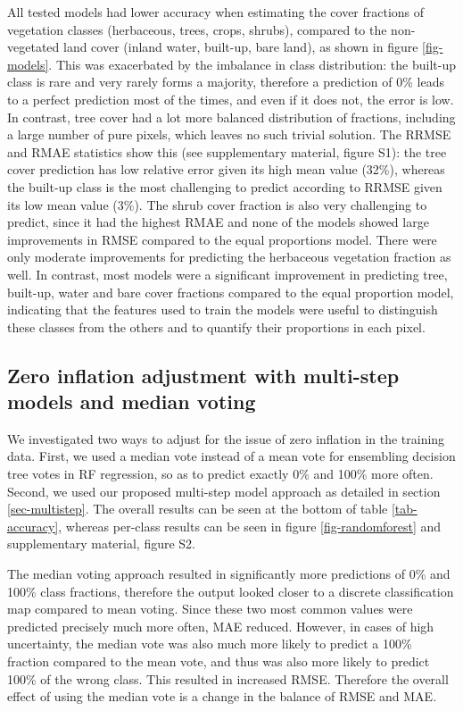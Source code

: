 \documentclass[review,authoryear,3p]{elsarticle}
\begin{document}
All tested models had lower accuracy when estimating the cover fractions of vegetation classes (herbaceous, trees, crops, shrubs), compared to the non-vegetated land cover (inland water, built-up, bare land), as shown in figure \ref{fig-models}.
This was exacerbated by the imbalance in class distribution: the built-up class is rare and very rarely forms a majority, therefore a prediction of 0\% leads to a perfect prediction most of the times, and even if it does not, the error is low.
In contrast, tree cover had a lot more balanced distribution of fractions, including a large number of pure pixels, which leaves no such trivial solution.
The \gls{RRMSE} and \gls{RMAE} statistics show this (see supplementary material, figure S1): the tree cover prediction has low relative error given its high mean value (32\%), whereas the built-up class is the most challenging to predict according to \gls{RRMSE} given its low mean value (3\%).
The shrub cover fraction is also very challenging to predict, since it had the highest \gls{RMAE} and none of the models showed large improvements in \gls{RMSE} compared to the equal proportions model.
There were only moderate improvements for predicting the herbaceous vegetation fraction as well.
In contrast, most models were a significant improvement in predicting tree, built-up, water and bare cover fractions compared to the equal proportion model, indicating that the features used to train the models were useful to distinguish these classes from the others and to quantify their proportions in each pixel.

\subsection{Zero inflation adjustment with multi-step models and median voting}

We investigated two ways to adjust for the issue of zero inflation in the training data.
First, we used a median vote instead of a mean vote for ensembling decision tree votes in \gls{RF} regression, so as to predict exactly 0\% and 100\% more often.
Second, we used our proposed multi-step model approach as detailed in section \ref{sec-multistep}.
The overall results can be seen at the bottom of table \ref{tab-accuracy}, whereas per-class results can be seen in figure \ref{fig-randomforest} and supplementary material, figure S2.

The median voting approach resulted in significantly more predictions of 0\% and 100\% class fractions, therefore the output looked closer to a discrete classification map compared to mean voting.
Since these two most common values were predicted precisely much more often, \gls{MAE} reduced.
However, in cases of high uncertainty, the median vote was also much more likely to predict a 100\% fraction compared to the mean vote, and thus was also more likely to predict 100\% of the wrong class.
This resulted in increased \gls{RMSE}.
Therefore the overall effect of using the median vote is a change in the balance of \gls{RMSE} and \gls{MAE}.
\end{document}
